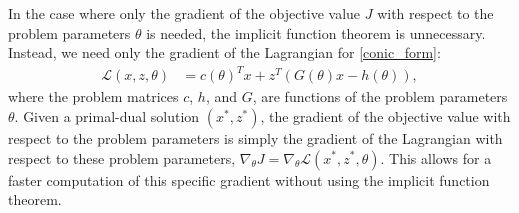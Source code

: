 In the case where only the gradient of the objective value $J$ with respect to the problem parameters $\theta$ is needed, the implicit function theorem is unnecessary. Instead, we need only the gradient of the Lagrangian for \eqref{conic_form}: 
\begin{align}
    \mathcal{L}(x,z,\theta) &= c(\theta)^Tx + z^T(G(\theta) x - h(\theta)),
\end{align}
where the problem matrices $c$, $h$, and $G$, are functions of the problem parameters $\theta$. Given a primal-dual solution $(x^*,z^*)$, the gradient of the objective value with respect to the problem parameters is simply the gradient of the Lagrangian with respect to these problem parameters, $ \nabla_\theta J = {\nabla_\theta \mathcal{L}(x^*,z^*,\theta)}$.
This allows for a faster computation of this specific gradient without using the implicit function theorem.
